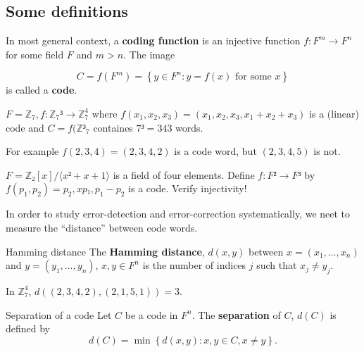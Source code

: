 \documentclass[english]{lbscript}
\begin{document}
\subsection{Some definitions}
\label{sec:some-definitions}

\begin{definition}{}{}
	In most general context, a \textbf{coding function} is an injective function \(f:F^{m}→F^{n}\) for some field \(F\) and \(m>n\). The image

	\begin{equation}
		\label{eq:130}
		C=f(F^{m}) = \left\{ y∈F^{n}: y=f(x) \text{ for some } x \right\}
	\end{equation}
	is called a \textbf{code}.
\end{definition}

\begin{example}{}{}
	\(F=ℤ_{7}, f: ℤ_{7}³→ℤ_{7}^{4}\) where \(f(x_1,x_2,x_3)=(x_1,x_2,x_3,x_1+x_2+x_3)\) is a (linear) code and \(C=f(ℤ³_{7}\) containes \(7³=343\) words.

	For example \(f(2,3,4)=(2,3,4,2)\) is a code word, but \((2,3,4,5)\) is not.
\end{example}

\begin{example}{}{}
	\(F=ℤ₂[x]/⟨x²+x+1⟩\) is a field of four elements. Define \(f:F²→F³\) by \(f(p_1, p_2)=p_2, xp₁, p_1-p_2\) is a code. Verify injectivity!
\end{example}

In order to study error-detection and error-correction systematically, we neet to measure the \enquote{distance} between code words.

\begin{definition}{Hamming distance}{}
	The \textbf{Hamming distance}, \(d(x,y)\) between \(x=(x_1, \dots, x_n)\) and \(y=(y_1, \dots, y_n)\), \(x,y∈F^{n}\) is the number of indices \(j\) such that \(x_j≠y_j\).
\end{definition}

\begin{example}{}{}
	In \(ℤ_{7}^{4}\), \(d\left((2,3,4,2), (2,1,5,1) \right) = 3\).
\end{example}

\begin{definition}{Separation of a code}{}
	Let \(C\) be a code in \(F^{n}\). The \textbf{separation} of \(C\), \(d(C)\) is defined by
	\begin{equation}
		\label{eq:131}
		d(C)=\min\left\{ d(x,y): x,y∈C, x≠y \right\}.
	\end{equation}
\end{definition}
\end{document}
